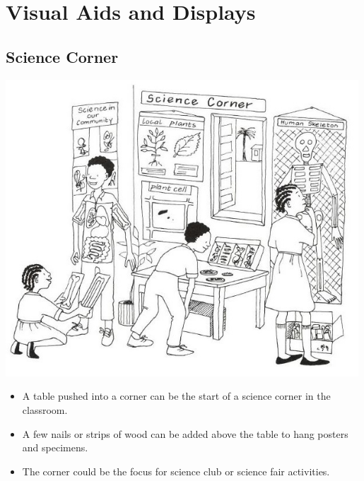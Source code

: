 \chapter{Visual Aids and Displays}  
\label{cha:displays}


\section{Science Corner}

\begin{center}
\includegraphics[width=0.99\textwidth]{./img/vso/science-corner.jpg}
\end{center}

\begin{itemize}
\item A table pushed into a corner can be the start of a science corner in
the classroom.
\item A few nails or strips of wood can be added above the table to hang
posters and specimens.
\item The corner could be the focus for science club or science fair activities.
\end{itemize}

\vfill
\pagebreak


